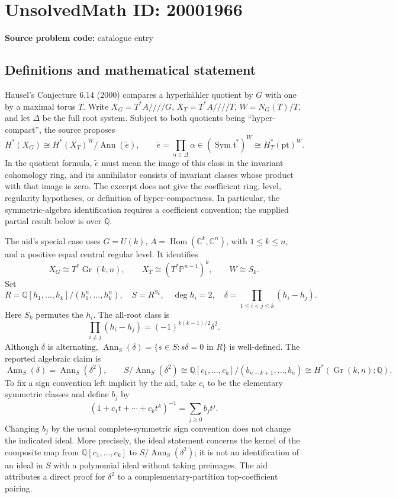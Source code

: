 \documentclass[11pt]{article}
\newcommand{\Q}{\mathbb{Q}}
\newcommand{\C}{\mathbb{C}}
\newcommand{\PP}{\mathbb{P}}
\begin{document}
\section*{UnsolvedMath ID: 20001966}
\textbf{Source problem code:} catalogue entry
\subsection{Definitions and mathematical statement}
Hausel's Conjecture 6.14 (2000) compares a hyperkähler quotient by \(G\) with one by a maximal torus \(T\). Write \(X_G=T^*A/\!/\!/\!/G\), \(X_T=T^*A/\!/\!/\!/T\), \(W=N_G(T)/T\), and let \(\Delta\) be the full root system. Subject to both quotients being ``hyper-compact'', the source proposes
\[
 H^*(X_G)\cong H^*(X_T)^W/\operatorname{Ann}(\widetilde e),
 \qquad \widetilde e=\prod_{\alpha\in\Delta}\alpha
 \in(\operatorname{Sym}\mathfrak t^*)^W\cong H_T^*(\mathrm{pt})^W.
\]
In the quotient formula, \(\widetilde e\) must mean the image of this class in the invariant cohomology ring, and its annihilator consists of invariant classes whose product with that image is zero. The excerpt does not give the coefficient ring, level, regularity hypotheses, or definition of hyper-compactness. In particular, the symmetric-algebra identification requires a coefficient convention; the supplied partial result below is over \(\Q\).

The aid's special case uses \(G=U(k)\), \(A=\operatorname{Hom}(\C^k,\C^n)\), with \(1\le k\le n\), and a positive equal central regular level. It identifies
\[
 X_G\cong T^*\operatorname{Gr}(k,n),\qquad
 X_T\cong(T^*\PP^{n-1})^k,\qquad W\cong S_k.
\]
Set
\[
 R=\Q[h_1,\ldots,h_k]/(h_1^n,\ldots,h_k^n),\quad
 S=R^{S_k},\quad \deg h_i=2,\quad
 \delta=\prod_{1\le i<j\le k}(h_i-h_j).
\]
Here \(S_k\) permutes the \(h_i\). The all-root class is
\[
 \prod_{i\ne j}(h_i-h_j)=(-1)^{k(k-1)/2}\delta^2.
\]
Although \(\delta\) is alternating, \(\operatorname{Ann}_S(\delta)=\{s\in S:s\delta=0\text{ in }R\}\) is well-defined. The reported algebraic claim is
\[
 \operatorname{Ann}_S(\delta)=\operatorname{Ann}_S(\delta^2),\qquad
 S/\operatorname{Ann}_S(\delta^2)
 \cong\Q[c_1,\ldots,c_k]/(b_{n-k+1},\ldots,b_n)
 \cong H^*(\operatorname{Gr}(k,n);\Q).
\]
To fix a sign convention left implicit by the aid, take \(c_i\) to be the elementary symmetric classes and define \(b_j\) by
\[
 (1+c_1t+\cdots+c_kt^k)^{-1}=\sum_{j\ge0}b_jt^j.
\]
Changing \(b_j\) by the usual complete-symmetric sign convention does not change the indicated ideal. More precisely, the ideal statement concerns the kernel of the composite map from \(\Q[c_1,\ldots,c_k]\) to \(S/\operatorname{Ann}_S(\delta^2)\); it is not an identification of an ideal in \(S\) with a polynomial ideal without taking preimages. The aid attributes a direct proof for \(\delta^2\) to a complementary-partition top-coefficient pairing.
\end{document}

